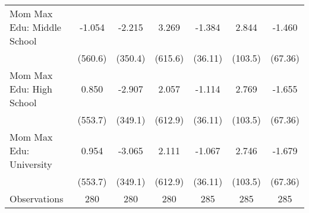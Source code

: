 {\begin{tabular}{l*{6}{c}}
\addlinespace
Mom Max Edu: Middle School&      -1.054         &      -2.215         &       3.269         &      -1.384         &       2.844         &      -1.460         \\
                    &     (560.6)         &     (350.4)         &     (615.6)         &     (36.11)         &     (103.5)         &     (67.36)         \\
\addlinespace
Mom Max Edu: High School&       0.850         &      -2.907         &       2.057         &      -1.114         &       2.769         &      -1.655         \\
                    &     (553.7)         &     (349.1)         &     (612.9)         &     (36.11)         &     (103.5)         &     (67.36)         \\
\addlinespace
Mom Max Edu: University&       0.954         &      -3.065         &       2.111         &      -1.067         &       2.746         &      -1.679         \\
                    &     (553.7)         &     (349.1)         &     (612.9)         &     (36.11)         &     (103.5)         &     (67.36)         \\
\midrule
Observations        &         280         &         280         &         280         &         285         &         285         &         285         \\
\bottomrule
\end{tabular}
}
